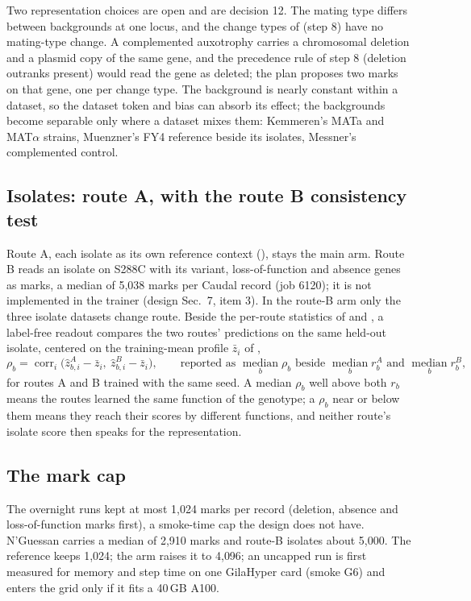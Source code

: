 Two representation choices are open and are decision 12. The mating type differs between
backgrounds at one locus, and the change types of  (step 8) have no mating-type
change. A complemented auxotrophy carries a chromosomal deletion and a plasmid copy of the
same gene, and the precedence rule of step 8 (deletion outranks present) would read the gene as
deleted; the plan proposes two marks on that gene, one per change type. The background is
nearly constant within a dataset, so the dataset token and bias can absorb its effect; the
backgrounds become separable only where a dataset mixes them: Kemmeren's MATa and MAT$\alpha$
strains, Muenzner's FY4 reference beside its isolates, Messner's complemented control.

\subsection{Isolates: route A, with the route B consistency test}
\label{sec:routes}

Route A, each isolate as its own reference context (), stays the main arm. Route B
reads an isolate on S288C with its variant, loss-of-function and absence genes as marks, a
median of 5{,}038 marks per Caudal record (job 6120); it is not implemented in the trainer
(design Sec.~7, item 3). In the route-B arm only the three isolate datasets change route. Beside
the per-route statistics of  and , a label-free readout compares the two
routes' predictions on the same held-out isolate, centered on the training-mean profile
$\bar z_i$ of ,
\begin{equation}
\rho_b = \operatorname{corr}_{i}\big(\hat z^{A}_{b,i} - \bar z_i,\ \hat z^{B}_{b,i} - \bar z_i\big),
\qquad
\text{reported as } \operatorname*{median}_{b} \rho_b \text{ beside } \operatorname*{median}_b r^{A}_b \text{ and } \operatorname*{median}_b r^{B}_b,
\label{eq:routecons}
\end{equation}
for routes A and B trained with the same seed. A median $\rho_b$ well above both $r_b$ means
the routes learned the same function of the genotype; a $\rho_b$ near or below them means
they reach their scores by different functions, and neither route's isolate score then speaks
for the representation.

\subsection{The mark cap}
\label{sec:markcap}

The overnight runs kept at most 1{,}024 marks per record (deletion, absence and
loss-of-function marks first), a smoke-time cap the design does not have. N'Guessan carries
a median of 2{,}910 marks and route-B isolates about 5{,}000. The reference keeps 1{,}024; the
arm raises it to 4{,}096; an uncapped run is first measured for memory and step time on one
GilaHyper card (smoke G6) and enters the grid only if it fits a 40\,GB A100.
